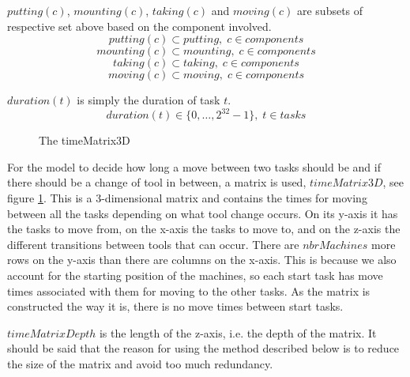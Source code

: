   \noindent $putting(c)$, $mounting(c)$, $taking(c)$ and $moving(c)$ are subsets of respective set above based on the component involved.
 \begin{equation}\label{eq:35}
 putting(c) \subset putting, \; c \in components
 \end{equation}
 \begin{equation}\label{eq:36}
 mounting(c) \subset mounting, \; c \in components
 \end{equation}
 \begin{equation}\label{eq:37}
 taking(c) \subset taking, \; c \in components
 \end{equation}
 \begin{equation}\label{eq:38}
 moving(c) \subset moving, \; c \in components
 \end{equation}

  \noindent $duration(t)$ is simply the duration of task $t$.
 \begin{equation}\label{eq:42}
 duration(t) \in \{0 , \ldots , 2^{32}-1\}, \; t \in tasks
 \end{equation}
 
   \begin{figure}
   	\centering
    	
    	\caption{The timeMatrix3D}
    	\label{fig:3d_matrix}
   \end{figure}

\noindent For the model to decide how long a move between two tasks should be and if there should be a change of tool in between, a matrix is used, $timeMatrix3D$, see figure \ref{fig:3d_matrix}. This is a 3-dimensional matrix and contains the times for moving between all the tasks depending on what tool change occurs. On its y-axis it has the tasks to move from, on the x-axis the tasks to move to, and on the z-axis the different transitions between tools that can occur. There are $nbrMachines$ more rows on the y-axis than there are columns on the x-axis. This is because we also account for the starting position of the machines, so each start task has move times associated with them for moving to the other tasks. As the matrix is constructed the way it is, there is no move times between start tasks. 

 $timeMatrixDepth$ is the length of the z-axis, i.e. the depth of the matrix. It should be said that the reason for using the method described below is to reduce the size of the matrix and avoid too much redundancy.
 
